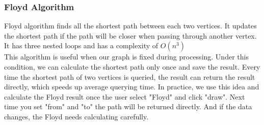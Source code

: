 \documentclass{article}
\begin{document}
\subsubsection{Floyd Algorithm}
Floyd algorithm finds all the shortest path between each two vertices. It updates the shortest path if the path will be closer when passing through another vertex. It has three nested loops and has a complexity of $O(n^3)$\\
This algorithm is useful when our graph is fixed during processing. Under this condition, we can calculate the shortest path only once and save the result. Every time the shortest path of two vertices is queried, the result can return the result directly, which speeds up average querying time. In practice, we use this idea and calculate the Floyd result once the user select "Floyd" and click "draw". Next time you set "from" and "to" the path will be returned directly. And if the data changes, the Floyd needs calculating carefully.\\
\end{document}
